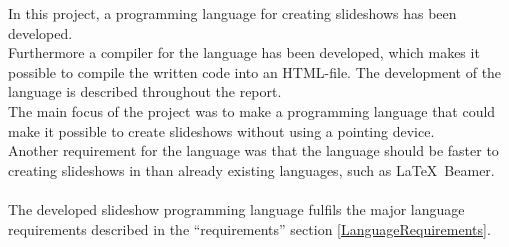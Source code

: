 In this project, a programming language for creating slideshows has been developed. \\
Furthermore a compiler for the language has been developed, which makes it possible to compile the written code into an HTML-file. The development of the language is described throughout the report. \\
The main focus of the project was to make a programming language that could make it possible to create slideshows without using a pointing device. \\
Another requirement for the language was that the language should be faster to creating slideshows in than already existing languages, such as \LaTeX~Beamer.
\\ \\
The developed slideshow programming language fulfils the major language requirements described in the ``requirements'' section \ref{LanguageRequirements}.

